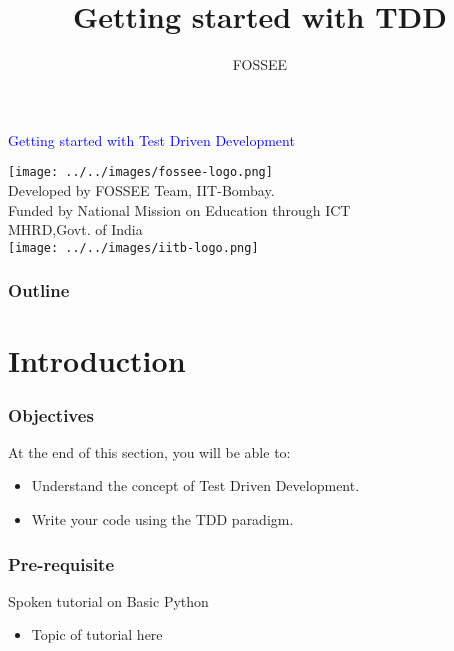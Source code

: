 \documentclass[12pt,presentation]{beamer}
\title{Getting started with TDD}
\author{FOSSEE}
\institute{IIT Bombay}
\begin{document}
\begin{frame}

\begin{center}
\vspace{12pt}
\textcolor{blue}{\huge Getting started with Test Driven Development}
\end{center}
\vspace{18pt}
\begin{center}
\vspace{10pt}
\texttt{[image: ../../images/fossee-logo.png]}\\
\vspace{5pt}
\scriptsize Developed by FOSSEE Team, IIT-Bombay. \\ 
\scriptsize Funded by National Mission on Education through ICT\\
\scriptsize  MHRD,Govt. of India\\
\texttt{[image: ../../images/iitb-logo.png]}\\
\end{center}
\end{frame}

\begin{frame}
\frametitle{Outline}
\setcounter{tocdepth}{3}
\tableofcontents
\end{frame}

\section{Introduction}

\begin{frame}
  \frametitle{Objectives}
  At the end of this section, you will be able to:
  \begin{itemize}
  \item Understand the concept of Test Driven Development.
  \item Write your code using the TDD paradigm.
  \end{itemize}
\end{frame}


\begin{frame}
\frametitle{Pre-requisite}
\label{sec-3}

Spoken tutorial on Basic Python
\begin{itemize}
\item Topic of tutorial here
\end{itemize}
\end{frame}
\end{document}
